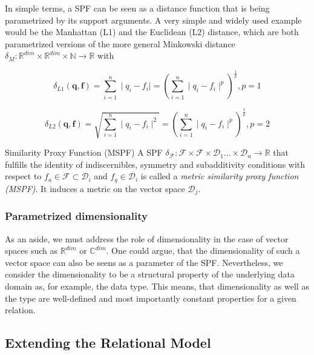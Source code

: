 In simple terms, a SPF can be seen as a distance function that is being parametrized by its support arguments. A very simple and widely used example would be the Manhattan (L1) and the Euclidean (L2) distance, which are both parametrized versions of the more general Minkowski distance $\delta_{M} \colon \mathbb{R}^{dim} \times \mathbb{R}^{dim} \times \mathbb{N} \to \mathbb{R}$ with


\begin{equation}
    \delta_{L1}(\mathbf{q},\mathbf{f}) = \sum_{i=1}^{n} \mid q_i - f_i \mid = \left(\sum_{i=1}^{n} \mid q_i - f_i \mid^p\right)^{\frac{1}{p}}, p = 1
\end{equation}

\begin{equation}
    \delta_{L2}(\mathbf{q},\mathbf{f}) = \sqrt{\sum_{i=1}^{n} \mid q_i - f_i \mid^2}= \left(\sum_{i=1}^{n} \mid q_i - f_i \mid^p\right)^{\frac{1}{p}}, p = 2
\end{equation}


\begin{definition}[label=definition:spf]{Similarity Proxy Function (MSPF)}{}
    A SPF $\delta_{\mathcal{F}} \colon \mathcal{F} \times \mathcal{F} \times \mathcal{D}_{1} ... \times \mathcal{D}_{n} \to \mathbb{R}$ that fulfills the identity of indiscernibles, symmetry and subadditivity conditions with respect to $f_{a}  \in \mathcal{F} \subset \mathcal{D}_i$ and $f_{q} \in \mathcal{D}_i$ is called a \emph{metric similarity proxy function (MSPF)}. It induces a metric on the vector space $\mathcal{D}_j$.
\end{definition}

\subsubsection{Parametrized dimensionality}
As an aside, we must address the role of dimensionality in the case of vector spaces such as $\mathbb{R}^{dim}$ or $\mathbb{C}^{dim}$. One could argue, that the dimensionality of such a vector space can also be seens as a parameter of the SPF. Nevertheless, we consider the dimensionality to be a structural property of the underlying data domain as, for example, the data type. This means, that dimensionality as well as the type are well-defined and most importantly constant properties for a given relation.

\subsection{Extending the Relational Model}

